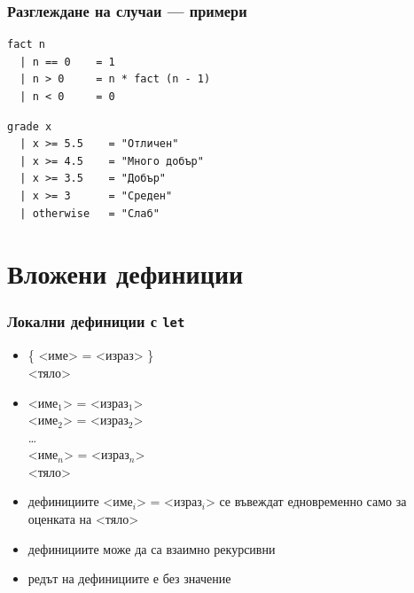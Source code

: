 \documentclass{beamer}
\begin{document}
\begin{frame}[fragile]
  \frametitle{Разглеждане на случаи --- примери}
\begin{verbatim}
fact n
  | n == 0    = 1
  | n > 0     = n * fact (n - 1)
  | n < 0     = 0
\end{verbatim}
\pause\vspace{1em}
\begin{verbatim}
grade x
  | x >= 5.5    = "Отличен"
  | x >= 4.5    = "Много добър"
  | x >= 3.5    = "Добър"
  | x >= 3      = "Среден"
  | otherwise   = "Слаб"
\end{verbatim}
\end{frame}

\section{Вложени дефиниции}

\begin{frame}
  \frametitle{Локални дефиниции с \tt{let}}
  \begin{itemize}
  \item {} \{ <име> \tta= <израз> \}\\
     <тяло>
  \item {} <име$_1$> \tta= <израз$_1$>\\
    \hspace{5ex}<име$_2$> \tta= <израз$_2$>\\
    \hspace{5ex}\ldots\\
    \hspace{5ex}<име$_n$> \tta= <израз$_n$>\\
     <тяло>
  \item дефинициите <име$_i$> = <израз$_i$> се въвеждат едновременно само за оценката на <тяло>
  \item дефинициите може да са взаимно рекурсивни
  \item редът на дефинициите е без значение
  \end{itemize}
\end{frame}
\end{document}
